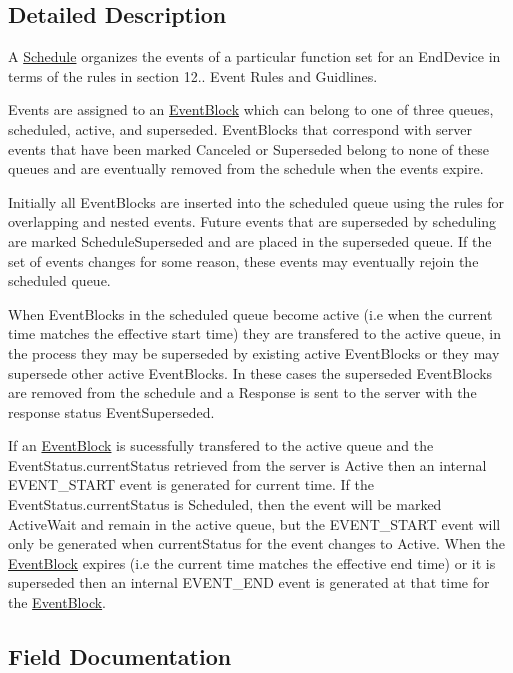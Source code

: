 \subsection{Detailed Description}
A \hyperlink{structSchedule}{Schedule} organizes the events of a particular function set for an End\+Device in terms of the rules in section 12.. Event Rules and Guidlines. 

Events are assigned to an \hyperlink{structEventBlock}{Event\+Block} which can belong to one of three queues, {\ttfamily scheduled}, {\ttfamily active}, and {\ttfamily superseded}. Event\+Blocks that correspond with server events that have been marked Canceled or Superseded belong to none of these queues and are eventually removed from the schedule when the events expire.

Initially all Event\+Blocks are inserted into the {\ttfamily scheduled} queue using the rules for overlapping and nested events. Future events that are superseded by scheduling are marked {\ttfamily Schedule\+Superseded} and are placed in the superseded queue. If the set of events changes for some reason, these events may eventually rejoin the {\ttfamily scheduled} queue.

When Event\+Blocks in the scheduled queue become active (i.\+e when the current time matches the effective start time) they are transfered to the {\ttfamily active} queue, in the process they may be superseded by existing active Event\+Blocks or they may supersede other active Event\+Blocks. In these cases the superseded Event\+Blocks are removed from the schedule and a Response is sent to the server with the response status Event\+Superseded.

If an \hyperlink{structEventBlock}{Event\+Block} is sucessfully transfered to the {\ttfamily active} queue and the Event\+Status.\+current\+Status retrieved from the server is Active then an internal E\+V\+E\+N\+T\+\_\+\+S\+T\+A\+RT event is generated for current time. If the Event\+Status.\+current\+Status is Scheduled, then the event will be marked {\ttfamily Active\+Wait} and remain in the active queue, but the E\+V\+E\+N\+T\+\_\+\+S\+T\+A\+RT event will only be generated when current\+Status for the event changes to Active. When the \hyperlink{structEventBlock}{Event\+Block} expires (i.\+e the current time matches the effective end time) or it is superseded then an internal E\+V\+E\+N\+T\+\_\+\+E\+ND event is generated at that time for the \hyperlink{structEventBlock}{Event\+Block}. 

\subsection{Field Documentation}
\mbox{\label{structSchedule_ac21659f7ad23db734ff12a5818fbfe30}} 
